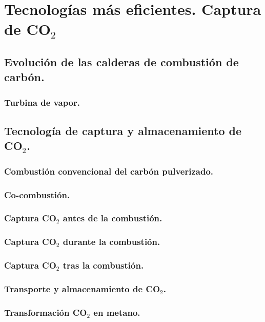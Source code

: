 \chapter{Tecnologías más eficientes. Captura de $\textbf{CO}_2$}
\section{Evolución de las calderas de combustión de carbón.}

\subsection{Turbina de vapor.}

\section{Tecnología de captura y almacenamiento de CO$_2$.}

\subsection{Combustión convencional del carbón pulverizado.}

\subsection{Co-combustión.}

\subsection{Captura CO$_2$ antes de la combustión.}

\subsection{Captura CO$_2$ durante la combustión.}

\subsection{Captura CO$_2$ tras la combustión.}

\subsection{Transporte y almacenamiento de CO$_2$.}

\subsection{Transformación CO$_2$ en metano.}

